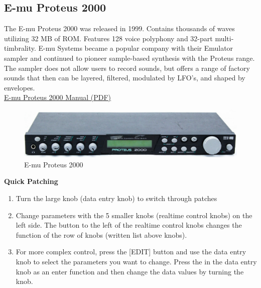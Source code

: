 \newpage

\newpage

\subsection{E-mu Proteus 2000}

	The E-mu Proteus 2000 was released in 1999. Contains thousands of waves utilizing 32 MB of ROM. Features 128 voice polyphony and 32-part multi-timbrality. E-mu Systems became a popular company with their Emulator sampler and continued to pioneer sample-based synthesis with the Proteus range. The sampler does not allow users to record sounds, but offers a range of factory sounds that then can be layered, filtered, modulated by LFO's, and shaped by envelopes. \\
\linebreak
\href{https://github.com/dkadyrov/MIDILab/blob/master/Manuals/EMU_Proteus2000.pdf}{E-mu Proteus 2000 Manual (PDF)}


\begin{figure}[h]
\centering
\includegraphics[width=.85\textwidth]{Images/e-mu-proteus-2000}
\caption{E-mu Proteus 2000}
\label{fig:fullfig}
\end{figure}

\textbf{Quick Patching}
\begin{enumerate}
	\item Turn the large knob (data entry knob) to switch through patches
	\item Change parameters with the 5 smaller knobs (realtime control knobs) on the left side. The button to the left of the realtime control knobs changes the function of the row of knobs (written list above knobs).
	\item For more complex control, press the [EDIT] button and use the data entry knob to select the parameters you want to change. Press the in the data entry knob as an enter function and then change the data values by turning the knob.
\end{enumerate}
